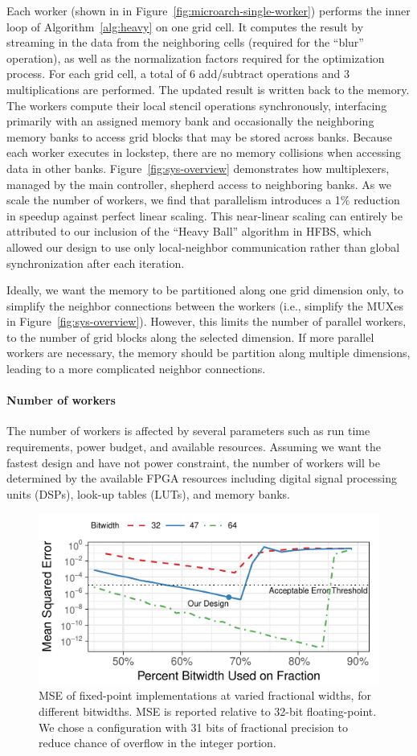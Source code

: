 Each worker (shown in in Figure~\ref{fig:microarch-single-worker}) performs the inner loop of Algorithm~\ref{alg:heavy} on one grid cell.
It computes the result by streaming in the data from the neighboring cells (required for the ``blur'' operation), as well as the normalization factors required for the optimization process.
For each grid cell, a total of 6 add/subtract operations and 3 multiplications are performed. The updated result is written back to the memory.
The workers compute their local stencil operations synchronously, interfacing primarily with an assigned memory bank and occasionally the neighboring memory banks to access grid blocks that may be stored across banks.
Because each worker executes in lockstep, there are no memory collisions when accessing data in other banks.
Figure~\ref{fig:sys-overview} demonstrates how multiplexers, managed by the main controller, shepherd access to neighboring banks.
As we scale the number of workers, we find that parallelism introduces a 1\% reduction in speedup against perfect linear scaling.
This near-linear scaling can entirely be attributed to our inclusion of the ``Heavy Ball'' algorithm in HFBS, which allowed our design to use only local-neighbor communication rather than global synchronization after each iteration.


Ideally, we want the memory to be partitioned along one grid dimension only, to simplify the neighbor connections between the workers (i.e., simplify the MUXes in Figure~\ref{fig:sys-overview}).
However, this limits the number of parallel workers, to the number of grid blocks along the selected dimension.
If more parallel workers are necessary, the memory should be partition along multiple dimensions, leading to a more complicated neighbor connections.



\paragraph{Number of workers}
The number of workers is affected by several parameters such as run time requirements, power budget, and available resources. Assuming we want the fastest design and have not power constraint, the number of workers will be determined by the available FPGA resources including digital signal processing units (DSPs), look-up tables (LUTs), and memory banks.

  \begin{figure}[h]
		\centering
		\includegraphics[width=.5\columnwidth]{hfbs-figs/fixed_point.pdf}
		\caption{MSE of fixed-point implementations at varied fractional widths, for different bitwidths. MSE is reported relative to 32-bit floating-point. We chose a configuration with 31 bits of fractional precision to reduce chance of overflow in the integer portion.}
		\label{fig:fixed-point}
  \end{figure}

